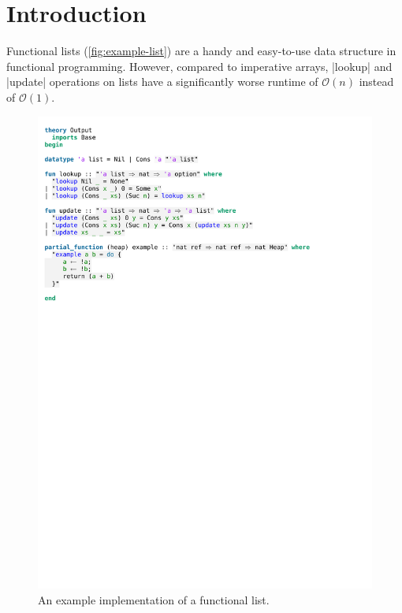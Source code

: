 \chapter{Introduction}\label{chapter:introduction}


Functional lists (\autoref{fig:example-list}) are a handy and easy-to-use data structure in functional programming. However, compared to imperative arrays, |lookup| and |update| operations on lists have a significantly worse runtime of $\mathcal{O}(n)$ instead of $\mathcal{O}(1)$. 

\begin{figure}[htpb]
\includegraphics[trim={0 22,2cm 0 2,3cm},clip, width=1.00\textwidth]{figures/Theory_Intro.pdf}
\caption[Example functional list implementation]{An example implementation of a functional list.}\label{fig:example-list}
\end{figure}

